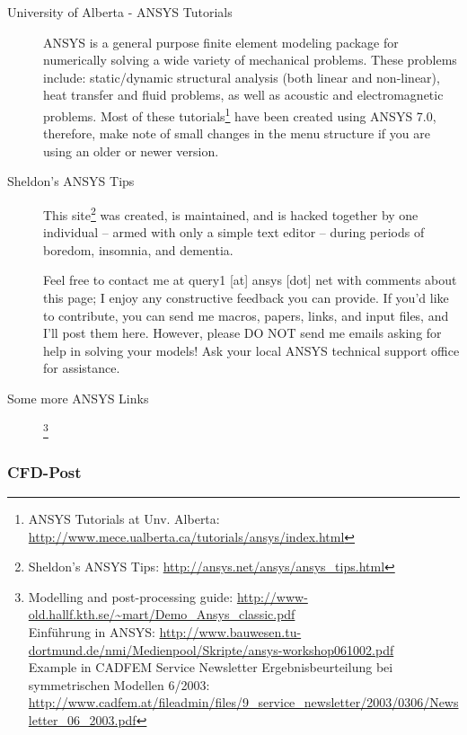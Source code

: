 \begin{description}
\item[University  of Alberta  - ANSYS  Tutorials] ANSYS  is a  general purpose
finite  element modeling  package for  numerically solving  a wide  variety of
mechanical  problems.   These   problems  include:  static/dynamic  structural
analysis (both  linear and non-linear),  heat transfer and fluid  problems, as
well   as    acoustic   and   electromagnetic   problems.    Most   of   these
tutorials\footnote{ANSYS        Tutorials        at       Unv.        Alberta:
\url{http://www.mece.ualberta.ca/tutorials/ansys/index.html}}     have    been
created using  ANSYS 7.0, therefore,  make note of  small changes in  the menu
structure if you are using an older or newer version.


\item[Sheldon's   ANSYS  Tips]   This   site\footnote{Sheldon's  ANSYS   Tips:
\url{http://ansys.net/ansys/ansys_tips.html}} was  created, is maintained, and
is hacked together by one individual –  armed with only a simple text editor –
during periods of boredom, insomnia, and dementia.

Feel free  to contact me  at query1 [at]  ansys [dot] net with  comments about
this page; I enjoy any constructive feedback you can provide. If you'd like to
contribute, you can  send me macros, papers, links, and  input files, and I'll
post  them here. However,  please DO  NOT send  me emails  asking for  help in
solving  your  models! Ask  your  local  ANSYS  technical support  office  for
assistance.

\item[Some more ANSYS Links]\footnote{
Modelling             and             post-processing             guide:
\url{http://www-old.hallf.kth.se/\~mart/Demo\_Ansys\_classic.pdf}\\
Einführung in ANSYS:
\url{http://www.bauwesen.tu-dortmund.de/nmi/Medienpool/Skripte/ansys-workshop061002.pdf}\\
Example   in   CADFEM   Service  Newsletter   Ergebnisbeurteilung   bei
symmetrischen                          Modellen                         6/2003:
\url{http://www.cadfem.at/fileadmin/files/9\_service\_newsletter/2003/0306/Newsletter\_06\_2003.pdf}
}
\end{description}

\subsubsection{CFD-Post}
\label{sec:intro_ansys_cfdpost}

